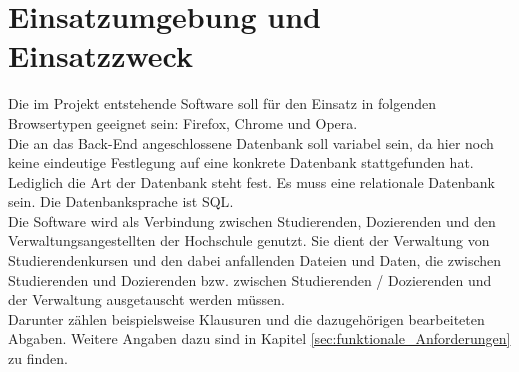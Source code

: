 
\chapter{Einsatzumgebung und Einsatzzweck}
Die im Projekt entstehende Software soll für den Einsatz in folgenden Browsertypen geeignet sein: Firefox, Chrome und Opera. \\
Die an das \gls{Back-End} angeschlossene Datenbank soll variabel sein, da hier noch keine eindeutige Festlegung auf eine konkrete Datenbank stattgefunden hat. Lediglich die Art der Datenbank steht fest. Es muss eine \gls{relationale Datenbank} sein. Die Datenbanksprache ist \gls{SQL}.\\

Die Software wird als Verbindung zwischen \gls{Studierende}n, \gls{Dozierende}n und den \gls{Verwaltungsangestellte}n der Hochschule genutzt. Sie dient der Verwaltung von \gls{Studierendenkurs}en und den dabei anfallenden Dateien und Daten, die zwischen \gls{Studierende}n und \gls{Dozierende}n bzw. zwischen \gls{Studierende}n / \gls{Dozierende}n und der Verwaltung ausgetauscht werden müssen. \\
Darunter zählen beispielsweise Klausuren und die dazugehörigen \gls{bearbeitete}n Abgaben. Weitere Angaben dazu sind in Kapitel \ref{sec:funktionale_Anforderungen} zu finden. 
